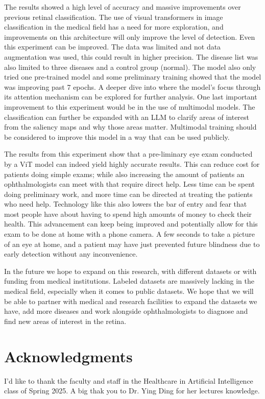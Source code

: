 \documentclass[sigconf]{acmart}
\begin{document}
The results showed a high level of accuracy and massive improvements over previous retinal classification. The use of visual transformers in image classification in the medical field has a need for more exploration, and improvements on this architecture will only improve the level of detection. Even this experiment can be improved. The data was limited and not data augmentation was used, this could result in higher precision. The disease list was also limited to three diseases and a control group (normal). The model also only tried one pre-trained model and some preliminary training showed that the model was improving past 7 epochs. A deeper dive into where the model's focus through its attention mechanism can be explored for further analysis. One last important improvement to this experiment would be in the use of multimodal models. The classification can further be expanded with an LLM to clarify areas of interest from the saliency maps and why those areas matter. Multimodal training should be considered to improve this model in a way that can be used publicly.

The results from this experiment show that a pre-liminary eye exam conducted by a ViT model can indeed yield highly accurate results. This can reduce cost for patients doing simple exams; while also increasing the amount of patients an ophthalmologists can meet with that require direct help. Less time can be spent doing preliminary work, and more time can be directed at treating the patients who need help. Technology like this also lowers the bar of entry and fear that most people have about having to spend high amounts of money to check their health. This advancement can keep being improved and potentially allow for this exam to be done at home with a phone camera. A few seconds to take a picture of an eye at home, and a patient may have just prevented future blindness due to early detection without any inconvenience.

In the future we hope to expand on this research, with different datasets or with funding from medical institutions. Labeled datasets are massively lacking in the medical field, especially when it comes to public datasets. We hope that we will be able to partner with medical and research facilities to expand the datasets we have, add more diseases and work alongside ophthalmologists to diagnose and find new areas of interest in the retina. 

\section{Acknowledgments}

I'd like to thank the faculty and staff in the Healthcare in Artificial Intelligence class of Spring 2025. A big thak you to Dr. Ying Ding for her lectures knowledge.



\end{document}
